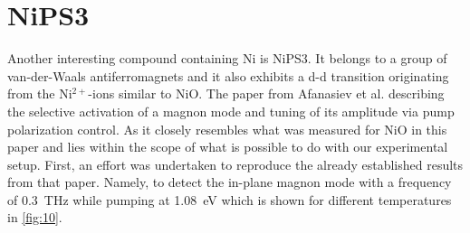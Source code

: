 \section{NiPS3}
Another interesting compound containing Ni is NiPS3.
It belongs to a group of van-der-Waals antiferromagnets and it also exhibits a d-d transition originating from the Ni$^{2+}$-ions similar to NiO.
The paper from Afanasiev et al.  describing the selective activation of a magnon mode and tuning of its amplitude via pump polarization control.
As it closely resembles what was measured for NiO in this paper and lies within the scope of what is possible to do with our experimental setup.
First, an effort was undertaken to reproduce the already established results from that paper.
Namely, to detect the in-plane magnon mode with a frequency of \qty{0.3}{THz} while pumping at \qty{1.08}{eV} which is shown for different temperatures in \autoref{fig:10}.
